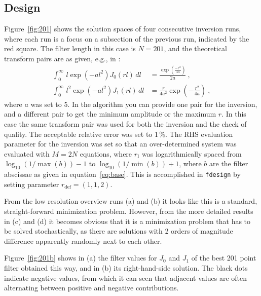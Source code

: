 \documentclass[paper,twocolumn,twoside]{geophysics}
\newcommand{\mr}[1]{\mathrm{#1}}
\begin{document}
\subsection{Design}
Figure~\ref{fig:201} shows the solution spaces of four consecutive inversion
runs, where each run is a focus on a subsection of the previous run, indicated
by the red square.
%
%
%
The filter length in this case is $N=201$, and the theoretical transform pairs
are as given, e.g., in \cite{USGS.75.Anderson}:
%
\begin{align}
  \int^\infty_0\,l \exp\left(-al^2\right) J_0(rl)\,dl &=
  \frac{\exp\left(\frac{-r^2}{4a}\right)}{2a}\ , \\
  \int^\infty_0\,l^2 \exp\left(-al^2\right) J_1(rl)\,dl &=
  \frac{r}{4a^2} \exp\left(-\frac{r^2}{4a}\right)\ ,
  \label{eq:j01}
\end{align}
%
where $a$ was set to 5. In the algorithm you can provide one pair for the
inversion, and a different pair to get the minimum amplitude or the maximum
$r$. In this case the same transform pair was used for both the inversion and
the check of quality. The acceptable relative error was set to 1\,\%. The RHS
evaluation parameter for the inversion was set so  that an over-determined
system was evaluated with $M = 2N$ equations, where $r_\mr{I}$ was
logarithmically spaced from $\log_{10}(1/\max(b)) - 1$ to $\log_{10}(1/\min(b))
+ 1$, where $b$ are the filter abscissae as given in equation~\ref{eq:base}.
This is accomplished in \texttt{fdesign} by setting parameter $r_\mr{def} = (1,
1, 2)$.

From the low resolution overview runs (a) and (b) it looks like this is a
standard, straight-forward minimization problem. However, from the more
detailed results in (c) and (d) it becomes obvious that it is a minimization
problem that has to be solved stochastically, as there are solutions with 2
orders of magnitude difference apparently randomly next to each other.

Figure~\ref{fig:201b} shows in (a) the filter values for $J_0$ and $J_1$ of the
best 201 point filter obtained this way, and in (b) its right-hand-side
solution. The black dots indicate negative values, from which it can seen that
adjacent values are often alternating between positive and negative
contributions.
%
%
\end{document}
